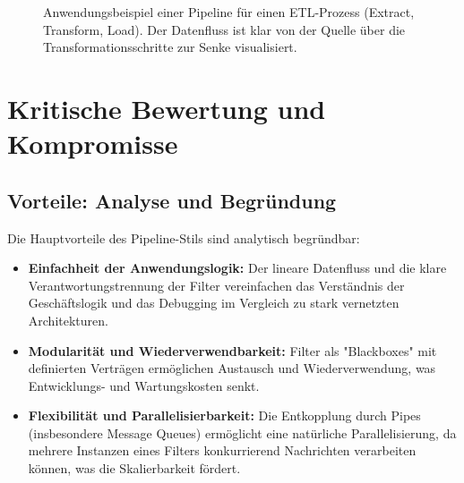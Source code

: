 \documentclass[10pt,a4paper]{article}
\begin{document}
\begin{figure}[h!]
\centering
{}
\caption{Anwendungsbeispiel einer Pipeline für einen ETL-Prozess (Extract, Transform, Load). Der Datenfluss ist klar von der Quelle über die Transformationsschritte zur Senke visualisiert.}
\label{fig:etl_example}
\end{figure}

\section{Kritische Bewertung und Kompromisse}
\subsection{Vorteile: Analyse und Begründung}
Die Hauptvorteile des Pipeline-Stils sind analytisch begründbar:
\begin{itemize}
\item \textbf{Einfachheit der Anwendungslogik:} Der lineare Datenfluss und die klare Verantwortungstrennung der Filter vereinfachen das Verständnis der Geschäftslogik und das Debugging im Vergleich zu stark vernetzten Architekturen.\cite{richards2020}
\item \textbf{Modularität und Wiederverwendbarkeit:} Filter als "Blackboxes" mit definierten Verträgen ermöglichen Austausch und Wiederverwendung, was Entwicklungs- und Wartungskosten senkt.\cite{packt_cpp_architecture}
\item \textbf{Flexibilität und Parallelisierbarkeit:} Die Entkopplung durch Pipes (insbesondere Message Queues) ermöglicht eine natürliche Parallelisierung, da mehrere Instanzen eines Filters konkurrierend Nachrichten verarbeiten können, was die Skalierbarkeit fördert.\cite{researchgate_parallel_pipes}
\end{itemize}
\end{document}

